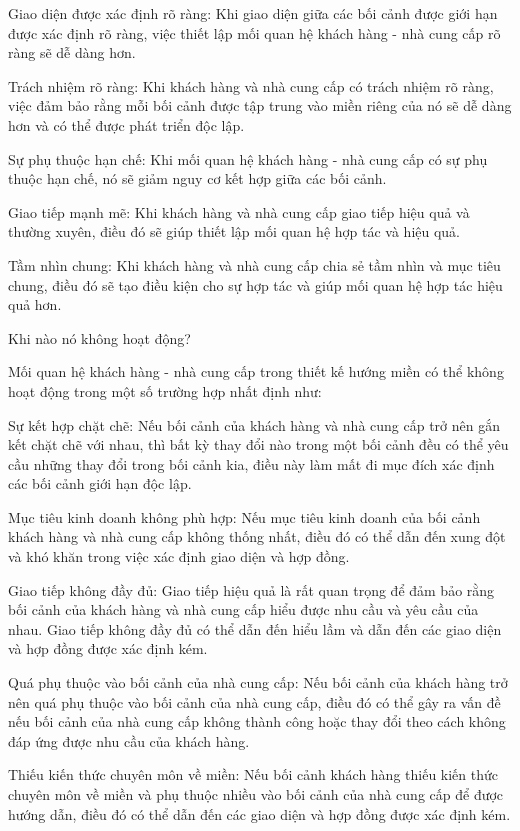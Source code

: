 Giao diện được xác định rõ ràng: Khi giao diện giữa các bối cảnh được giới hạn được xác định rõ ràng, việc thiết lập mối quan hệ khách hàng - nhà cung cấp rõ ràng sẽ dễ dàng hơn.

Trách nhiệm rõ ràng: Khi khách hàng và nhà cung cấp có trách nhiệm rõ ràng, việc đảm bảo rằng mỗi bối cảnh được tập trung vào miền riêng của nó sẽ dễ dàng hơn và có thể được phát triển độc lập.

Sự phụ thuộc hạn chế: Khi mối quan hệ khách hàng - nhà cung cấp có sự phụ thuộc hạn chế, nó sẽ giảm nguy cơ kết hợp giữa các bối cảnh.

Giao tiếp mạnh mẽ: Khi khách hàng và nhà cung cấp giao tiếp hiệu quả và thường xuyên, điều đó sẽ giúp thiết lập mối quan hệ hợp tác và hiệu quả.

Tầm nhìn chung: Khi khách hàng và nhà cung cấp chia sẻ tầm nhìn và mục tiêu chung, điều đó sẽ tạo điều kiện cho sự hợp tác và giúp mối quan hệ hợp tác hiệu quả hơn.

Khi nào nó không hoạt động?

Mối quan hệ khách hàng - nhà cung cấp trong thiết kế hướng miền có thể không hoạt động trong một số trường hợp nhất định như:

Sự kết hợp chặt chẽ: Nếu bối cảnh của khách hàng và nhà cung cấp trở nên gắn kết chặt chẽ với nhau, thì bất kỳ thay đổi nào trong một bối cảnh đều có thể yêu cầu những thay đổi trong bối cảnh kia, điều này làm mất đi mục đích xác định các bối cảnh giới hạn độc lập.

Mục tiêu kinh doanh không phù hợp: Nếu mục tiêu kinh doanh của bối cảnh khách hàng và nhà cung cấp không thống nhất, điều đó có thể dẫn đến xung đột và khó khăn trong việc xác định giao diện và hợp đồng.

Giao tiếp không đầy đủ: Giao tiếp hiệu quả là rất quan trọng để đảm bảo rằng bối cảnh của khách hàng và nhà cung cấp hiểu được nhu cầu và yêu cầu của nhau. Giao tiếp không đầy đủ có thể dẫn đến hiểu lầm và dẫn đến các giao diện và hợp đồng được xác định kém.

Quá phụ thuộc vào bối cảnh của nhà cung cấp: Nếu bối cảnh của khách hàng trở nên quá phụ thuộc vào bối cảnh của nhà cung cấp, điều đó có thể gây ra vấn đề nếu bối cảnh của nhà cung cấp không thành công hoặc thay đổi theo cách không đáp ứng được nhu cầu của khách hàng.

Thiếu kiến thức chuyên môn về miền: Nếu bối cảnh khách hàng thiếu kiến thức chuyên môn về miền và phụ thuộc nhiều vào bối cảnh của nhà cung cấp để được hướng dẫn, điều đó có thể dẫn đến các giao diện và hợp đồng được xác định kém.

